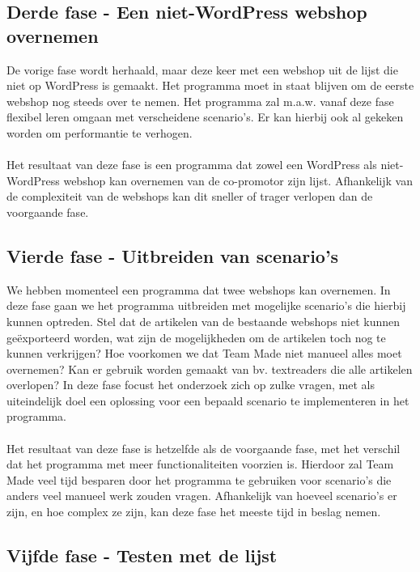 \subsection{Derde fase - Een niet-WordPress webshop overnemen}

De vorige fase wordt herhaald, maar deze keer met een webshop uit de lijst die niet op WordPress is gemaakt. Het programma moet in staat blijven om de eerste webshop nog steeds over te nemen. Het programma zal m.a.w. vanaf deze fase flexibel leren omgaan met verscheidene scenario's. Er kan hierbij ook al gekeken worden om performantie te verhogen.
\\\\
Het resultaat van deze fase is een programma dat zowel een WordPress als niet-WordPress webshop kan overnemen van de co-promotor zijn lijst. Afhankelijk van de complexiteit van de webshops kan dit sneller of trager verlopen dan de voorgaande fase.

\subsection{Vierde fase - Uitbreiden van scenario's}

We hebben momenteel een programma dat twee webshops kan overnemen. In deze fase gaan we het programma uitbreiden met mogelijke scenario's die hierbij kunnen optreden. Stel dat de artikelen van de bestaande webshops niet kunnen geëxporteerd worden, wat zijn de mogelijkheden om de artikelen toch nog te kunnen verkrijgen? Hoe voorkomen we dat Team Made niet manueel alles moet overnemen? Kan er gebruik worden gemaakt van bv. textreaders die alle artikelen overlopen? In deze fase focust het onderzoek zich op zulke vragen, met als uiteindelijk doel een oplossing voor een bepaald scenario te implementeren in het programma.
\\\\
Het resultaat van deze fase is hetzelfde als de voorgaande fase, met het verschil dat het programma met meer functionaliteiten voorzien is. Hierdoor zal Team Made veel tijd besparen door het programma te gebruiken voor scenario's die anders veel manueel werk zouden vragen. Afhankelijk van hoeveel scenario's er zijn, en hoe complex ze zijn, kan deze fase het meeste tijd in beslag nemen.

\subsection{Vijfde fase - Testen met de lijst}

